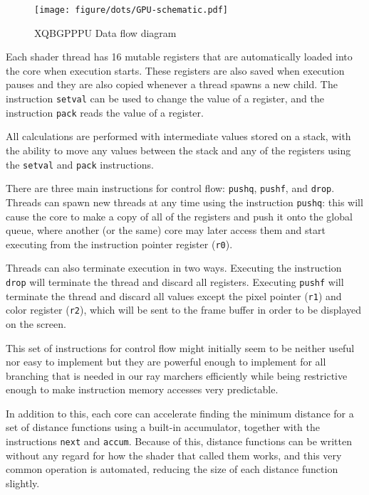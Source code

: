 			\begin{figure}[H]
				\centering
				\caption{ XQBGPPPU Data flow diagram }
				\texttt{[image: figure/dots/GPU-schematic.pdf]} 
				\vspace{-4pt}
			\end{figure}
	
			Each shader thread has 16 mutable registers that are automatically
			loaded into the core when execution starts. These registers are
			also saved when execution pauses and they are also copied whenever
			a thread spawns a new child. The instruction \texttt{setval} can be
			used to change the value of a register, and the instruction
			\texttt{pack} reads the value of a register.

			All calculations are performed with intermediate values stored on a
			stack, with the ability to move any values between the stack and
			any of the registers using the \texttt{setval} and \texttt{pack}
			instructions.

			There are three main instructions for control flow: \texttt{pushq},
			\texttt{pushf}, and \texttt{drop}. Threads can spawn new threads at
			any time using the instruction \texttt{pushq}: this will cause the
			core to make a copy of all of the registers and push it onto the
			global queue, where another (or the same) core may later access
			them and start executing from the instruction pointer register
			(\texttt{r0}).

			Threads can also terminate execution in two ways. Executing the
			instruction \texttt{drop} will terminate the thread and discard all
			registers. Executing \texttt{pushf} will terminate the thread and
			discard all values except the pixel pointer (\texttt{r1}) and color
			register (\texttt{r2}), which will be sent to the frame buffer in
			order to be displayed on the screen.

			This set of instructions for control flow might initially seem to
			be neither useful nor easy to implement but they are powerful
			enough to implement for all branching that is needed in our ray
			marchers efficiently while being restrictive enough to make
			instruction memory accesses very predictable.

			In addition to this, each core can accelerate finding the minimum 
			distance for a set of distance functions using a built-in 
			accumulator, together with the instructions \texttt{next} and 
			\texttt{accum}. Because of this, distance functions can be written
			without any regard for how the shader that called them works, and
			this very common operation is automated, reducing the size of each
			distance function slightly.

